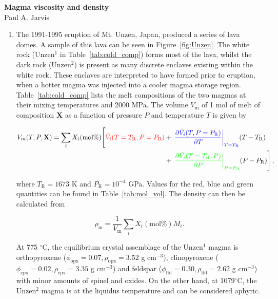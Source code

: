 \documentclass[]{book}
\theoremstyle{definition}
\begin{document}
\begin{center}
{\textbf{Magma viscosity and density}}\\
Paul A. Jarvis\\ %
\end{center}

\vspace{0.2 cm}


\begin{enumerate}
\item The 1991-1995 eruption of Mt. Unzen, Japan, produced a series of lava domes. A sample of this lava can be seen in Figure~\ref{fig:Unzen}. The white rock (Unzen$^{1}$ in Table~\ref{tab:cold_comp}) forms most of the lava, whilst the dark rock (Unzen$^{2}$) is present as many discrete enclaves existing within the white rock. These enclaves are interpreted to have formed prior to eruption, when a hotter magma was injected into a cooler magma storage region. Table~\ref{tab:cold_comp} lists the melt compositions of the two magmas at their mixing temperatures and 2000 MPa. The volume $V_{\text{m}}$ of 1 mol of melt of composition $\mathbf{X}$ as a function of pressure $P$ and temperature $T$ is given by

  \begin{align}
    \label{equ:mol_vol}
    V_{m}(T, P, \mathbf{X}) = \sum_{i} X_{i}(\text{mol\%}) \Bigg[ \textcolor{red}{\bar{V_{i}}(T = T_{\text{R}}, P = P_{\text{R}})} & + \left. \textcolor{blue}{\left. \frac{\partial \bar{V_{i}}(T, P = P_{\text{R}})}{\partial T}\right|_{T = T_{\text{R}}}} (T - T_{\text{R}}) \right. \nonumber \\
      & + \left. \textcolor{green}{\left.\frac{\partial \bar{V_{i}}(T = T_{\text{R}}, P)}{\partial P}\right|_{P = P_{R}}} (P - P_{\text{R}})\right], 
  \end{align}

  where $T_{\text{R}} = 1673$ K and $P_{\text{R}} = 10^{-4}$ GPa. Values for the red, blue and green quantities can be found in Table~\ref{tab:mol_vol}. The density can then be calculated from

  \begin{equation}
    \label{equ:dens}
    \rho_{\text{m}} = \frac{1}{V_{\text{m}}} \sum_{i} X_{i}(\text{mol\%}) M_{i}.
  \end{equation}
  
  At 775 $^{\circ}$C, the equilibrium crystal assemblage of the Unzen$^{1}$ magma is orthopyroxene ($\phi_{\text{opx}} = 0.07, \rho_{\text{opx}} = 3.52$ g cm$^{-3}$), clinopyroxene ($\phi_{\text{cpx}} = 0.02, \rho_{\text{cpx}} = 3.35$ g cm$^{-3}$) and feldspar ($\phi_{\text{fld}} = 0.30, \rho_{\text{fld}} = 2.62$ g cm$^{-3}$) with minor amounts of spinel and oxides. On the other hand, at 1079$^{\circ}$C, the Unzen$^{2}$ magma is at the liquidus temperature and can be considered aphyric.
  

\end{enumerate}
\end{document}

